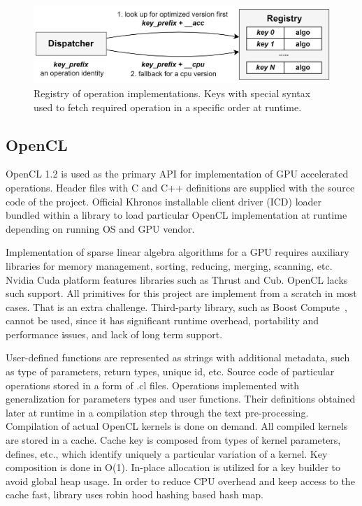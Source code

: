 \begin{figure}[]
\centering
\includegraphics[width=0.95\linewidth]{figures/registry.png}
\caption{Registry of operation implementations. Keys with special syntax used to fetch required operation in a specific order at runtime.}
\label{fig:reg}
\end{figure}

\subsection{OpenCL}

OpenCL 1.2 is used as the primary API for implementation of GPU accelerated operations. Header files with C and C++ definitions are supplied with the source code of the project. Official Khronos installable client driver (ICD) loader bundled within a library to load particular OpenCL implementation at runtime depending on running OS and GPU vendor. 

Implementation of sparse linear algebra algorithms for a GPU requires auxiliary libraries for memory management, sorting, reducing, merging, scanning, etc. 
Nvidia Cuda platform features libraries such as Thrust and Cub.  
OpenCL lacks such support. All primitives for this project are implement from a scratch in most cases. That is an extra challenge. Third-party library, such as Boost Compute~\cite{10.1145/2909437.2909454:boost:compute}, cannot be used, since it has significant runtime overhead, portability and performance issues, and lack of long term support.

User-defined functions are represented as strings with additional metadata, such as type of parameters, return types, unique id, etc. 
Source code of particular operations stored in a form of .cl files. 
Operations implemented with generalization for parameters types and user functions. 
Their definitions obtained later at runtime in a compilation step through the text pre-processing.
Compilation of actual OpenCL kernels is done on demand. 
All compiled kernels are stored in a cache. Cache key is composed from types of kernel parameters, defines, etc., which identify uniquely a particular variation of a kernel. 
Key composition is done in O(1). In-place allocation is utilized for a key builder to avoid global heap usage. 
In order to reduce CPU overhead and keep access to the cache fast, library uses robin hood hashing based hash map. 


